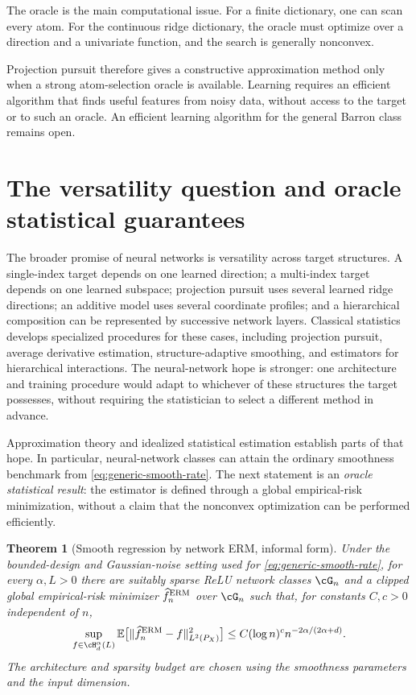 \documentclass[11pt,twoside]{article}
\newcommand{\E}{\mathbb E}
\newtheorem{theorem}{Theorem}[section]
\theoremstyle{definition}
\theoremstyle{remark}
\begin{document}
The oracle is the main computational issue. For a finite dictionary, one can
scan every atom. For the continuous ridge dictionary, the oracle must optimize
over a direction and a univariate function, and the search is generally
nonconvex.

Projection pursuit therefore gives a constructive approximation method only
when a strong atom-selection oracle is available. Learning requires an
efficient algorithm that finds useful features from noisy data, without
access to the target or to such an oracle. An efficient learning algorithm for
the general Barron class remains open.

\section{The versatility question and oracle statistical guarantees}
\label{sec:versatility}

The broader promise of neural networks is versatility across target
structures. A single-index target depends on one learned direction; a
multi-index target depends on one learned subspace; projection pursuit uses
several learned ridge directions; an additive model uses several coordinate
profiles; and a hierarchical composition can be represented by successive
network layers. Classical statistics develops specialized procedures for
these cases, including projection pursuit, average derivative estimation,
structure-adaptive smoothing, and estimators for hierarchical interactions.
The neural-network hope is stronger: one architecture and training procedure
would adapt to whichever of these structures the target possesses, without
requiring the statistician to select a different method in advance.

Approximation theory and idealized statistical estimation establish parts of
that hope. In particular, neural-network classes can attain the ordinary
smoothness benchmark from \cref{eq:generic-smooth-rate}. The next statement is
an \emph{oracle statistical result}: the estimator is defined through a
global empirical-risk minimization, without a claim that the nonconvex
optimization can be performed efficiently.

\begin{theorem}[Smooth regression by network ERM, informal form]
\label{thm:holder-network-erm}
Under the bounded-design and Gaussian-noise setting used for
\cref{eq:generic-smooth-rate}, for every \(\alpha,L>0\) there are suitably
sparse ReLU network classes \(\cG_n\) and a clipped global empirical-risk
minimizer \(\widehat f_n^{\rm ERM}\) over \(\cG_n\) such that, for constants
\(C,c>0\) independent of \(n\),
\begin{equation}
 \sup_{f\in\cH_d^\alpha(L)}
 \E\bigl[\|\widehat f_n^{\rm ERM}-f\|_{L^2(P_X)}^2\bigr]
 \leq C(\log n)^c n^{-2\alpha/(2\alpha+d)}.
 \label{eq:holder-network-erm-rate}
\end{equation}
The architecture and sparsity budget are chosen using the smoothness
parameters and the input dimension.
\end{theorem}
\end{document}
